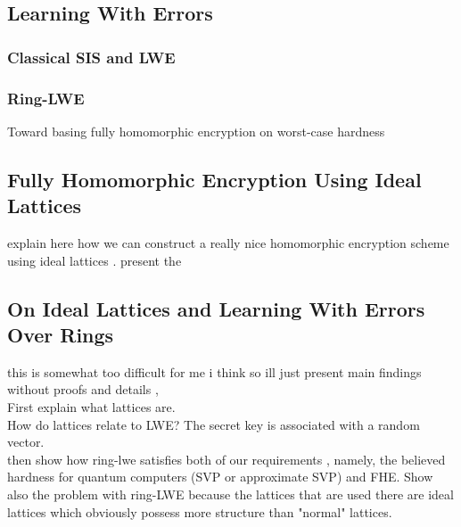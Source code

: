 \subsection{Learning With Errors}
\subsubsection*{Classical SIS and LWE}
\subsubsection*{Ring-LWE}
\cite{ring-lwe} 
Toward basing fully homomorphic encryption on worst-case hardness

\subsection{Fully Homomorphic Encryption Using Ideal Lattices}
explain here how we can construct a really nice homomorphic encryption scheme using ideal lattices \cite{gentry}. present the 
\subsection{On Ideal Lattices and Learning With Errors Over Rings}
this is somewhat too difficult for me i think so ill just present main findings without proofs and details \cite{regev}, \\
First explain what lattices are. \\
How do lattices relate to LWE? The secret key is associated with a random vector. \\
then show how ring-lwe satisfies both of our requirements \cite{ring-lwe}, namely, the believed hardness for quantum computers (SVP or approximate SVP) and FHE. Show also the problem with ring-LWE because the lattices that are used there are ideal lattices which obviously possess more structure than "normal" lattices.
